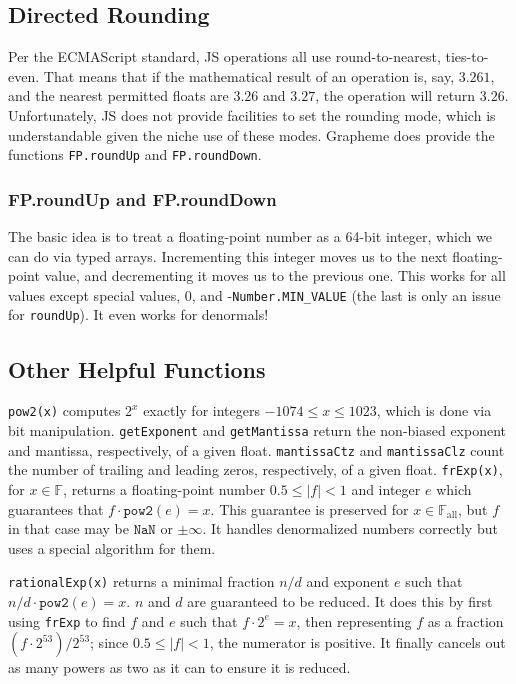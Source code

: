 \documentclass{article}
\newcommand{\NaN}{\texttt{NaN}}
\newcommand{\allfp}{\mathbb{F}_\text{all}}
\newcommand{\finitefp}{\mathbb{F}}
\begin{document}
\subsection{Directed Rounding}

Per the ECMAScript standard, JS operations all use round-to-nearest, ties-to-even. That means that if the mathematical result of an operation is, say, $3.261$, and the nearest permitted floats are $3.26$ and $3.27$, the operation will return $3.26$. Unfortunately, JS does not provide facilities to set the rounding mode, which is understandable given the niche use of these modes. Grapheme does provide the functions \texttt{FP.roundUp} and \texttt{FP.roundDown}.

\subsubsection{FP.roundUp and FP.roundDown}

The basic idea is to treat a floating-point number as a 64-bit integer, which we can do via typed arrays. Incrementing this integer moves us to the next floating-point value, and decrementing it moves us to the previous one. This works for all values except special values, 0, and -\texttt{Number.MIN\_VALUE} (the last is only an issue for \texttt{roundUp}). It even works for denormals!

\subsection{Other Helpful Functions}

\texttt{pow2(x)} computes $2^x$ exactly for integers $-1074\leq x \leq 1023$, which is done via bit manipulation. \texttt{getExponent} and \texttt{getMantissa} return the non-biased exponent and mantissa, respectively, of a given float. \texttt{mantissaCtz} and \texttt{mantissaClz} count the number of trailing and leading zeros, respectively, of a given float. \texttt{frExp(x)}, for $x\in \finitefp$, returns a floating-point number $0.5\leq |f| < 1$ and integer $e$ which guarantees that $f\cdot \texttt{pow2}(e)=x$. This guarantee is preserved for $x\in \allfp$, but $f$ in that case may be $\NaN$ or $\pm \infty$. It handles denormalized numbers correctly but uses a special algorithm for them.

\texttt{rationalExp(x)} returns a minimal fraction $n/d$ and exponent $e$ such that $n/d\cdot \texttt{pow2}(e)=x$. $n$ and $d$ are guaranteed to be reduced. It does this by first using \texttt{frExp} to find $f$ and $e$ such that $f\cdot 2^e = x$, then representing $f$ as a fraction $(f\cdot 2^{53})/2^{53}$; since $0.5\leq |f| < 1$, the numerator is positive. It finally cancels out as many powers as two as it can to ensure it is reduced.
\end{document}
